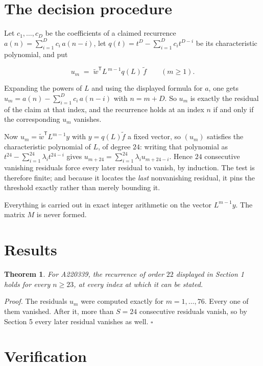 \documentclass[11pt]{article}
\newtheorem{theorem}{Theorem}
\theoremstyle{definition}
\begin{document}
\section{The decision procedure}

Let $c_1,\dots,c_D$ be the coefficients of a claimed recurrence $a(n) = \sum_{i=1}^{D} c_i\,a(n-i)$, let $q(t) = t^{D} - \sum_{i=1}^{D} c_i t^{D-i}$ be its characteristic polynomial, and put

\[u_m \;=\; \tilde w^{\mathsf T} L^{\,m-1} q(L)\,\tilde f \qquad (m \ge 1).\]

Expanding the powers of $L$ and using the displayed formula for $a$, one gets $u_m = a(n) - \sum_{i=1}^{D} c_i\,a(n-i)$ with $n = m + D$. So $u_m$ is exactly the residual of the claim at that index, and the recurrence holds at an index $n$ if and only if the corresponding $u_m$ vanishes.

Now $u_m = \tilde w^{\mathsf T} L^{m-1} y$ with $y = q(L)\tilde f$ a fixed vector, so $(u_m)$ satisfies the characteristic polynomial of $L$, of degree $24$: writing that polynomial as $t^{24} - \sum_{i=1}^{24} \lambda_i t^{24-i}$ gives $u_{m+24} = \sum_{i=1}^{24} \lambda_i u_{m+24-i}$. Hence $24$ consecutive vanishing residuals force every later residual to vanish, by induction. The test is therefore finite; and because it locates the {\itshape last} nonvanishing residual, it pins the threshold exactly rather than merely bounding it.

Everything is carried out in exact integer arithmetic on the vector $L^{m-1}y$. The matrix $M$ is never formed.

\section{Results}

\begin{theorem} For A220339, the recurrence of order $22$ displayed in Section 1 holds for every $n \ge 23$, at every index at which it can be stated.\end{theorem}

{\itshape Proof.} The residuals $u_m$ were computed exactly for $m = 1,\dots,76$. Every one of them vanished. After it, more than $S = 24$ consecutive residuals vanish, so by Section 5 every later residual vanishes as well. $\square$

\section{Verification}
\end{document}
